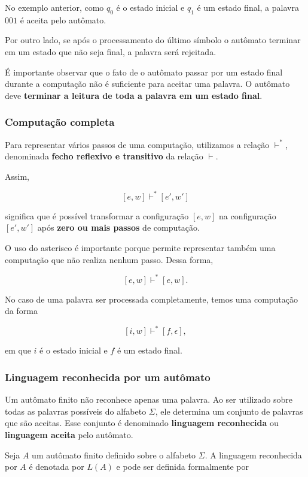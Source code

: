 \documentclass[
  brazilian,
  letterpaper,
]{book}
\theoremstyle{plain}
\theoremstyle{definition}
\theoremstyle{remark}
\begin{document}
No exemplo anterior, como \(q_0\) é o estado inicial e \(q_1\) é um
estado final, a palavra \(001\) é aceita pelo autômato.

Por outro lado, se após o processamento do último símbolo o autômato
terminar em um estado que não seja final, a palavra será rejeitada.

É importante observar que o fato de o autômato passar por um estado
final durante a computação não é suficiente para aceitar uma palavra. O
autômato deve \textbf{terminar a leitura de toda a palavra em um estado
final}.

\subsubsection{Computação completa}\label{computauxe7uxe3o-completa}

Para representar vários passos de uma computação, utilizamos a relação
\(\vdash^*\), denominada \textbf{fecho reflexivo e transitivo} da
relação \(\vdash\).

Assim,

\[
[e,w]\vdash^*[e',w']
\]

significa que é possível transformar a configuração \([e,w]\) na
configuração \([e',w']\) após \textbf{zero ou mais passos} de
computação.

O uso do asterisco é importante porque permite representar também uma
computação que não realiza nenhum passo. Dessa forma,

\[
[e,w]\vdash^*[e,w].
\]

No caso de uma palavra ser processada completamente, temos uma
computação da forma

\[
[i,w]\vdash^*[f,\epsilon],
\]

em que \(i\) é o estado inicial e \(f\) é um estado final.

\subsubsection{Linguagem reconhecida por um
autômato}\label{linguagem-reconhecida-por-um-autuxf4mato}

Um autômato finito não reconhece apenas uma palavra. Ao ser utilizado
sobre todas as palavras possíveis do alfabeto \(\Sigma\), ele determina
um conjunto de palavras que são aceitas. Esse conjunto é denominado
\textbf{linguagem reconhecida} ou \textbf{linguagem aceita} pelo
autômato.

Seja \(A\) um autômato finito definido sobre o alfabeto \(\Sigma\). A
linguagem reconhecida por \(A\) é denotada por \(L(A)\) e pode ser
definida formalmente por
\end{document}
